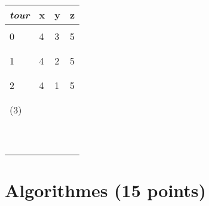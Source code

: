 \documentclass[11pt,a4paper]{article}
\begin{document}
\begin{table}[!ht]
\begin{minipage}{0.4\textwidth}
    \begin{tabular}{| C{1cm} | C{1cm} | C{1cm} | C{1cm} |}
        \hline
   \textit{tour}  &  \textbf{x}  &  \textbf{y}  &  \textbf{z}    \\
        \hline
                  &     &     &       \\
           0      &  4  &  3  &  5    \\
                  &     &     &       \\
        \hline
                  &     &     &       \\
           1      &  4  &  2  &  5    \\
                  &     &     &       \\
        \hline
                  &     &     &       \\
           2      &  4  &  1  &  5    \\
                  &     &     &       \\
        \hline
                  &     &     &       \\
          (3)     &     &     &       \\
                  &     &     &       \\
        \hline
                  &     &     &       \\
                  &     &     &       \\
                  &     &     &       \\
        \hline
                  &     &     &       \\
                  &     &     &       \\
                  &     &     &       \\
        \hline
                  &     &     &       \\
                  &     &     &       \\
                  &     &     &       \\
        \hline
    \end{tabular}
  \end{minipage}

\end{table}




\clearpage

\section{Algorithmes (15 points)}
\end{document}

